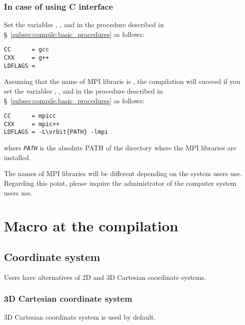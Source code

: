 \subsubsection{In case of using C interface}
Set the variables , , and  in the procedure described in \S~\ref{subsec:compile:basic_procedures} as follows:
\begin{screen}
\begin{verbatim}
CC      = gcc
CXX     = g++
LDFLAGS = 
\end{verbatim}  
\end{screen}

Assuming that the name of MPI librarie is , the compilation will succeed if you set the variables , , and  in the procedure described in \S~\ref{subsec:compile:basic_procedures} as follows:
\begin{screen}
\begin{Verbatim}[commandchars=\\\{\}]
CC      = mpicc
CXX     = mpic++
LDFLAGS = -L\vrbit{PATH} -lmpi
\end{Verbatim}  
\end{screen}
where \textit{\texttt{PATH}} is the absolute PATH of the directory where the MPI libraries are installed.



The names of MPI libraries will be different depending on the system users use. Regarding this point, please inquire the administrator of the computer system users use.

\section{Macro at the compilation}
\label{sec:macro_definition_at_compling}

\subsection{Coordinate system}
\label{subsec:macro_coordinate}
Users have alternatives of 2D and 3D Cartesian coordinate systems.

\subsubsection{3D Cartesian coordinate system}
3D Cartesian coordinate system is used by default.

